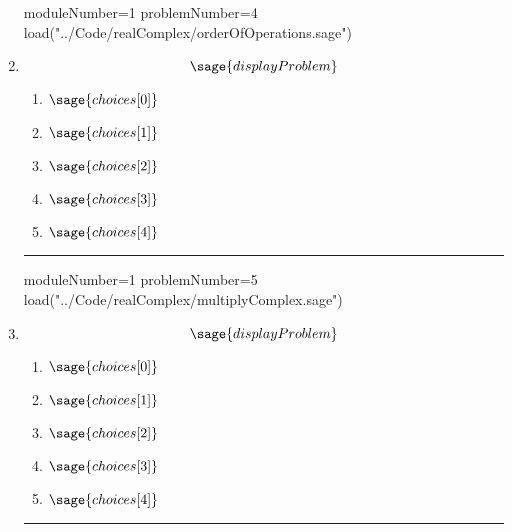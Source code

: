 \documentclass[14pt]{article}
\newcommand{\litem}[1]{\item#1\hspace*{-1cm}\rule{\textwidth}{0.4pt}}
\begin{document}
\begin{enumerate}
\begin{sagesilent}
moduleNumber=1
problemNumber=4
load("../Code/realComplex/orderOfOperations.sage")
\end{sagesilent}
\litem{ 

\[ \sage{displayProblem} \]

	\begin{enumerate}[label=\Alph*.]
		\item \( \sage{choices[0]} \)
		\item \( \sage{choices[1]} \)
		\item \( \sage{choices[2]} \)
		\item \( \sage{choices[3]} \)
		\item \( \sage{choices[4]} \)
	\end{enumerate} }

\begin{sagesilent}
moduleNumber=1
problemNumber=5
load("../Code/realComplex/multiplyComplex.sage")
\end{sagesilent}

\litem{ 

	\[ \sage{displayProblem} \]

	\begin{enumerate}[label=\Alph*.]
    \item \( \sage{choices[0]} \)
    \item \( \sage{choices[1]} \)
    \item \( \sage{choices[2]} \)
    \item \( \sage{choices[3]} \)
    \item \( \sage{choices[4]} \)
	\end{enumerate}
}

\end{enumerate}
\end{document}
